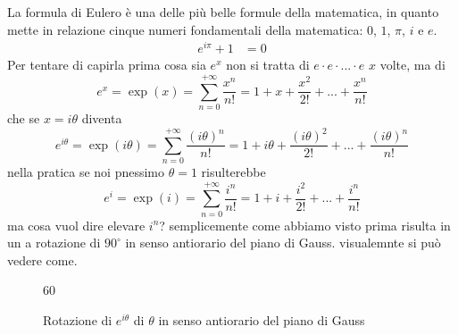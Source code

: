 \documentclass{book}
\begin{document}
\noindent\begin{minipage}{\textwidth}
    \begin{curiosity}[che significa \(e^{i\theta} = \cos\theta + i\sin\theta\)?]
        La formula di Eulero è una delle più belle formule della matematica, in quanto mette in relazione cinque numeri fondamentali della matematica: \(0\), \(1\), \(\pi\), \(i\) e \(e\).
        \begin{align*}
            e^{i\pi} + 1 & = 0
        \end{align*}
        Per tentare di capirla prima cosa sia \(e^x\) non si tratta di \(e \cdot e \cdot... \cdot e\) \(x\) volte, ma di
        \[e^{x} = \exp(x) = \sum_{n=0}^{+\infty} \frac{x^n}{n!} = 1 + x + \frac{x^2}{2!} + ... + \frac{x^n}{n!}\]
        che se \(x = i\theta\) diventa
        \[e^{i\theta} = \exp(i\theta) = \sum_{n=0}^{+\infty} \frac{(i\theta)^n}{n!} = 1 + i\theta + \frac{(i\theta)^2}{2!} + ... + \frac{(i\theta)^n}{n!}\]
        nella pratica se noi pnessimo \(\theta = 1\) risulterebbe
        \[e^{i} = \exp(i) = \sum_{n=0}^{+\infty} \frac{i^n}{n!} = 1 + i + \frac{i^2}{2!} + ... + \frac{i^n}{n!}\]
        ma cosa vuol dire elevare \(i^n\)? semplicemente come abbiamo visto prima risulta in un a rotazione di \(90^\circ\) in senso antiorario del piano di Gauss. visualemnte si può vedere come.
        \begin{figure}[H]
            \centering
            \begin{animateinline}{60}
            \end{animateinline}
            \caption{Rotazione di \(e^{i\theta}\) di \(\theta\) in senso antiorario del piano di Gauss}
        \end{figure}
    \end{curiosity}
\end{minipage}
\end{document}
